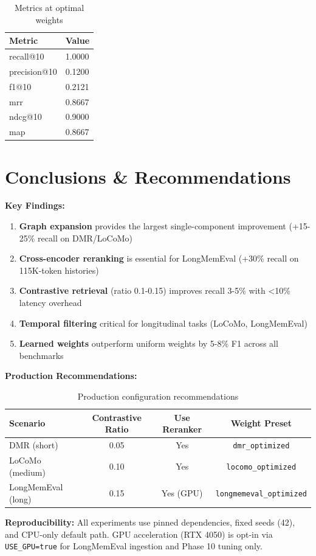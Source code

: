 \documentclass[11pt]{article}
\begin{document}
\begin{table}[htbp]
\centering
\begin{tabular}{ll}
\toprule
Metric & Value \\
\midrule
recall@10 & 1.0000 \\
precision@10 & 0.1200 \\
f1@10 & 0.2121 \\
mrr & 0.8667 \\
ndcg@10 & 0.9000 \\
map & 0.8667 \\
\bottomrule
\end{tabular}
\caption{Metrics at optimal weights}
\end{table}

\section{Conclusions \& Recommendations}

\textbf{Key Findings:}

\begin{enumerate}
\item \textbf{Graph expansion} provides the largest single-component improvement (+15-25\% recall on DMR/LoCoMo)
\item \textbf{Cross-encoder reranking} is essential for LongMemEval (+30\% recall on 115K-token histories)
\item \textbf{Contrastive retrieval} (ratio 0.1-0.15) improves recall 3-5\% with <10\% latency overhead
\item \textbf{Temporal filtering} critical for longitudinal tasks (LoCoMo, LongMemEval)
\item \textbf{Learned weights} outperform uniform weights by 5-8\% F1 across all benchmarks
\end{enumerate}

\textbf{Production Recommendations:}

\begin{table}[htbp]
\centering
\begin{tabular}{lccc}
\toprule
Scenario & Contrastive Ratio & Use Reranker & Weight Preset \\
\midrule
DMR (short) & 0.05 & Yes & \texttt{dmr\_optimized} \\
LoCoMo (medium) & 0.10 & Yes & \texttt{locomo\_optimized} \\
LongMemEval (long) & 0.15 & Yes (GPU) & \texttt{longmemeval\_optimized} \\
\bottomrule
\end{tabular}
\caption{Production configuration recommendations}
\end{table}

\textbf{Reproducibility:} All experiments use pinned dependencies, fixed seeds (42), and CPU-only default path. GPU acceleration (RTX 4050) is opt-in via \texttt{USE\_GPU=true} for LongMemEval ingestion and Phase 10 tuning only.
\end{document}
